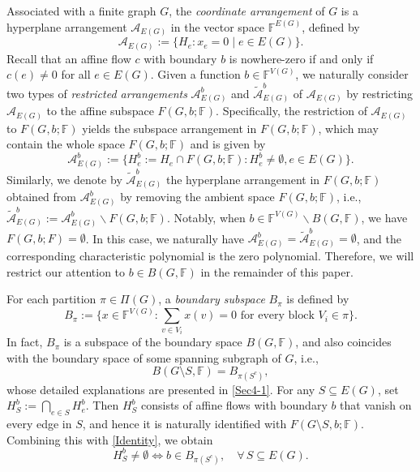 \documentclass[12pt]{article}%
\renewcommand*{\bm}[1]{#1}%
\numberwithin{equation}{section}
\begin{document}
Associated with a finite graph $G$, the {\em coordinate arrangement} of $G$ is a hyperplane arrangement $\mathcal{A}_{E(G)}$ in the vector space $\mathbb{F}^{E(G)}$, defined by
\[
\mathcal{A}_{E(G)}:=\big\{H_e:x_e=0\mid e\in E(G)\big\}.
\]
Recall that an affine flow $\bm c$ with boundary $\bm b$ is nowhere-zero if and only if $\bm c(e)\ne 0$ for all $e\in E(G)$. Given a function $\bm b\in \mathbb{F}^{V(G)}$, we naturally consider two types of {\em restricted arrangements} $\mathcal{A}_{E(G)}^{\bm b}$  and $\tilde{\mathcal{A}}_{E(G)}^{\bm b}$ of $\mathcal{A}_{E(G)}$ by restricting $\mathcal{A}_{E(G)}$ to the affine subspace $F(G,\bm b;\mathbb{F})$. Specifically, the restriction of $\mathcal{A}_{E(G)}$ to $F(G,\bm b;\mathbb{F})$ yields the subspace arrangement in $F(G,\bm b;\mathbb{F})$, which may contain the whole space $F(G,\bm b;\mathbb{F})$ and is given by 
\[
\mathcal{A}_{E(G)}^{\bm b}:=\big\{H_e^{\bm b}:=H_e\cap F(G,\bm b;\mathbb{F}): H_e^{\bm b}\ne\emptyset, e\in E(G)\big\}.
\]
Similarly, we denote by $\tilde{\mathcal{A}}_{E(G)}^{\bm b}$ the hyperplane arrangement in $F(G,\bm b;\mathbb{F})$ obtained from $\mathcal{A}_{E(G)}^{\bm b}$ by removing the ambient space $F(G,\bm b;\mathbb{F})$, i.e., $\tilde{\mathcal{A}}_{E(G)}^{\bm b}:=\mathcal{A}_{E(G)}^{\bm b}\smallsetminus F(G,\bm b;\mathbb{F})$. Notably, when $\bm b\in\mathbb{F}^{V(G)}\smallsetminus B(G,\mathbb{F})$, we have $F(G,\bm b;F)=\emptyset$. In this case, we naturally have $\mathcal{A}_{E(G)}^{\bm b}=\tilde{\mathcal{A}}_{E(G)}^{\bm b}=\emptyset$, and the corresponding characteristic polynomial is the zero polynomial. Therefore, we will restrict our attention to $\bm b\in B(G,\mathbb{F})$ in the remainder of this paper.

For each partition $\pi\in \Pi(G)$, a {\em boundary subspace} $B_\pi$ is defined by
\[
B_\pi:=\Big\{\bm x\in \mathbb{F}^{V(G)}: \sum_{v\in V_i}\bm x(v)=0\text{ for every block }V_i\in\pi\Big\}.
\]
In fact, $B_\pi$ is a subspace of the boundary space $B(G,\mathbb{F})$, and also coincides with the boundary space of some spanning subgraph of $G$, i.e.,
\begin{equation}\label{Identity}
B(G\setminus S,\mathbb{F})=B_{\pi(S^c)},
\end{equation}
whose detailed explanations are presented in \autoref{Sec4-1}. For any $S\subseteq E(G)$, set $H_S^{\bm b}:=\bigcap_{e\in S}H_e^{\bm b}$. Then $H_S^{\bm b}$ consists of affine flows with boundary $\bm b$ that vanish on every edge in $S$, and hence it is naturally identified with $F(G\setminus S,\bm b;\mathbb{F})$. Combining this with
\eqref{Identity}, we obtain
\begin{equation}\label{eq:equivalence for coset intersection nonempty}
H_S^{\bm b}\ne\emptyset\iff \bm b\in B_{\pi(S^c)},\quad \forall\, S\subseteq E(G).
\end{equation}
\end{document}
